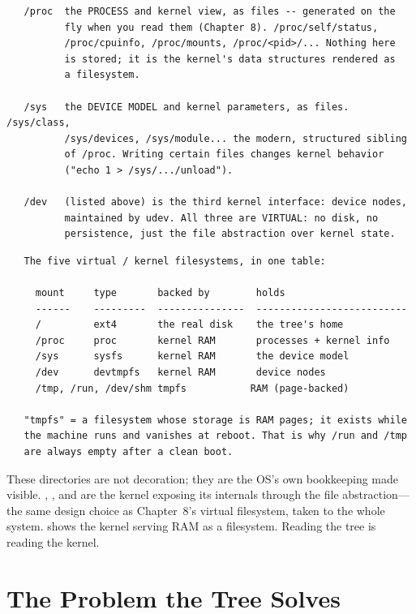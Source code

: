 \begin{verbatim}
   /proc  the PROCESS and kernel view, as files -- generated on the
          fly when you read them (Chapter 8). /proc/self/status,
          /proc/cpuinfo, /proc/mounts, /proc/<pid>/... Nothing here
          is stored; it is the kernel's data structures rendered as
          a filesystem.

   /sys   the DEVICE MODEL and kernel parameters, as files. /sys/class,
          /sys/devices, /sys/module... the modern, structured sibling
          of /proc. Writing certain files changes kernel behavior
          ("echo 1 > /sys/.../unload").

   /dev   (listed above) is the third kernel interface: device nodes,
          maintained by udev. All three are VIRTUAL: no disk, no
          persistence, just the file abstraction over kernel state.
\end{verbatim}

\begin{verbatim}
   The five virtual / kernel filesystems, in one table:

     mount     type       backed by        holds
     ------    ---------  ---------------  --------------------------
     /         ext4       the real disk    the tree's home
     /proc     proc       kernel RAM       processes + kernel info
     /sys      sysfs      kernel RAM       the device model
     /dev      devtmpfs   kernel RAM       device nodes
     /tmp, /run, /dev/shm tmpfs           RAM (page-backed)

   "tmpfs" = a filesystem whose storage is RAM pages; it exists while
   the machine runs and vanishes at reboot. That is why /run and /tmp
   are always empty after a clean boot.
\end{verbatim}

\begin{osconcept}
These directories are not decoration; they are the OS's own
bookkeeping made visible. , , and 
are the kernel exposing its internals through the file abstraction---
the same design choice as Chapter~8's virtual filesystem, taken to the
whole system.  shows the kernel serving RAM as a
filesystem. Reading the tree is reading the kernel.
\end{osconcept}

\section{The Problem the Tree Solves}


